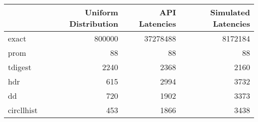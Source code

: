 \begin{tabular}{lrrr}
\toprule
{} &  Uniform Distribution &  API Latencies &  Simulated Latencies \\
\midrule
exact      &                800000 &       37278488 &              8172184 \\
prom       &                    88 &             88 &                   88 \\
tdigest    &                  2240 &           2368 &                 2160 \\
hdr        &                   615 &           2994 &                 3732 \\
dd         &                   720 &           1902 &                 3373 \\
circllhist &                   453 &           1866 &                 3438 \\
\bottomrule
\end{tabular}
